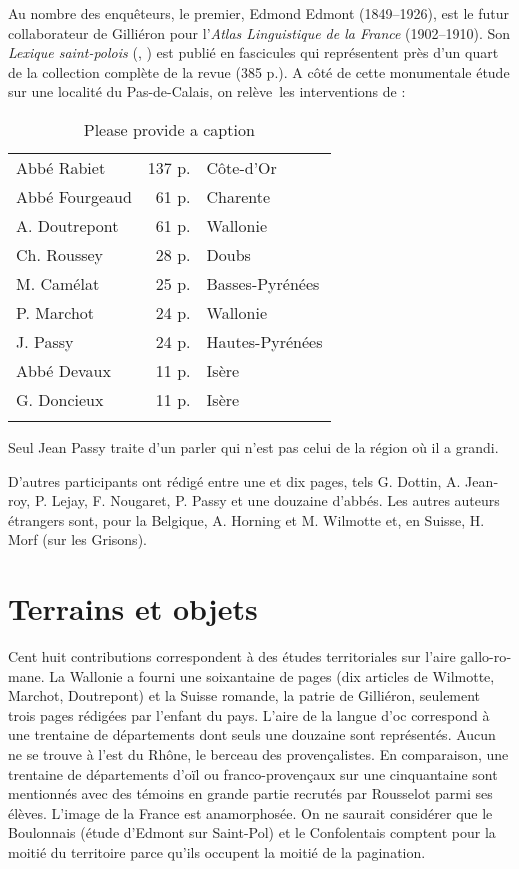 \documentclass[output=paper]{../langscibook}
\begin{document}
\begin{otherlanguage}{french}
Au nombre des enquêteurs, le premier, Edmond Edmont (1849--1926), est le futur collaborateur de Gilliéron pour l’\textit{Atlas Linguistique de la France} (1902--1910). Son \textit{Lexique saint-polois} (\citeyear{edmont_lexique_1887}, \citeyear{edmont_lexique_1897}) est publié en fascicules qui représentent près d’un quart de la collection complète de la revue (385 p.). A côté de cette monumentale étude sur une localité du Pas-de-Calais, on relève~les interventions de :

\begin{table}
\begin{tabular}{lrl}
\lsptoprule
Abbé Rabiet  &   137 p.   &  Côte-d’Or \\
Abbé Fourgeaud  &   61 p.  &  Charente \\
  A. Doutrepont  &     61 p.  &  Wallonie \\
  Ch. Roussey   &   28 p.  &  Doubs \\
  M. Camélat  &    25 p.  &  Basses-Pyrénées \\
  P. Marchot  &    24 p.  &  Wallonie \\
  J. Passy    &  24 p.  &  Hautes-Pyrénées \\
  Abbé Devaux    &   11 p.  &  Isère  \\
  G. Doncieux   &   11 p.  &  Isère \\
  \lspbottomrule
 \end{tabular} 
 \caption{\color{red}Please provide a caption}
 \end{table}
 
Seul Jean Passy traite d’un parler qui n’est pas celui de la région où il a grandi.

D’autres participants ont rédigé entre une et dix pages, tels G. Dottin, A. Jeanroy, P. Lejay, F. Nougaret, P. Passy et une douzaine d’abbés. Les autres auteurs étrangers sont, pour la Belgique, A. Horning et M. Wilmotte et, en Suisse, H. Morf (sur les Grisons).

\section{Terrains et objets}

Cent huit contributions correspondent à des études territoriales sur l’aire gallo-romane. La Wallonie a fourni une soixantaine de pages (dix articles de Wilmotte, Marchot, Doutrepont) et la Suisse romande, la patrie de Gilliéron, seulement trois pages rédigées par l’enfant du pays. L’aire de la langue d’oc correspond à une trentaine de départements dont seuls une douzaine sont représentés. Aucun ne se trouve à l’est du Rhône, le berceau des provençalistes. En comparaison, une trentaine de départements d’oïl ou franco-provençaux sur une cinquantaine sont mentionnés avec des témoins en grande partie recrutés par Rousselot parmi ses élèves. L’image de la France est anamorphosée. On ne saurait considérer que le Boulonnais (étude d’Edmont sur Saint-Pol) et le Confolentais comptent pour la moitié du territoire parce qu’ils occupent la moitié de la pagination. 


\end{otherlanguage}
\end{document}
